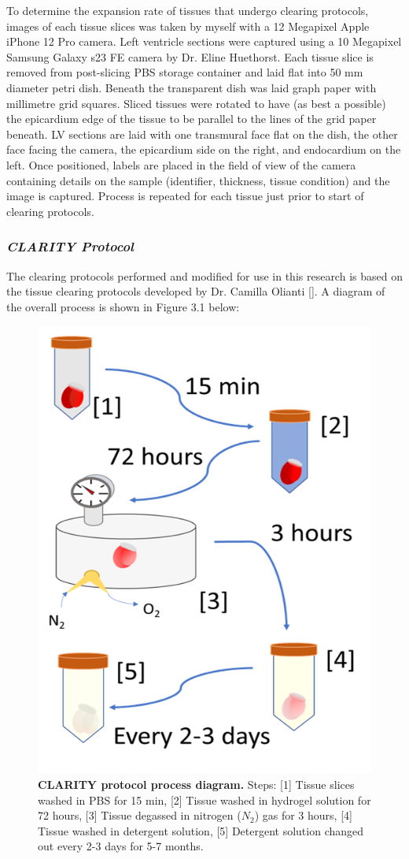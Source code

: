 To determine the expansion rate of tissues that undergo clearing protocols,  images of each tissue slices was taken by myself with a 12 Megapixel Apple iPhone 12 Pro camera. Left ventricle sections were captured using a 10 Megapixel Samsung Galaxy s23 FE camera by Dr. Eline Huethorst. Each tissue slice is removed from post-slicing PBS storage container and laid flat into 50 mm diameter petri dish.  Beneath the transparent dish was laid graph paper with millimetre grid squares. Sliced tissues were rotated to have (as best a possible) the epicardium edge of the tissue to be parallel to the lines of the grid paper beneath. LV sections are laid with one transmural face flat on the dish, the other face facing the camera, the epicardium side on the right, and endocardium on the left. Once positioned, labels are placed in the field of view of the camera containing details on the sample (identifier, thickness, tissue condition) and the image is captured. Process is repeated for each tissue just prior to start of clearing protocols. 

\subsubsection{\textit{CLARITY Protocol}}

The clearing protocols performed and modified for use in this research is based on the tissue clearing protocols developed by Dr. Camilla Olianti []. A diagram of the overall process is shown in Figure 3.1 below:

\begin{figure}[H]
    \centering
    \includegraphics[width=0.5\linewidth]{Figures/Figure3.1.png}
    \caption{\textbf{CLARITY protocol process diagram.} Steps: [1] Tissue slices washed in PBS for 15 min, [2] Tissue washed in hydrogel solution for 72 hours, [3] Tissue degassed in nitrogen ($N_2$) gas for 3 hours, [4] Tissue washed in detergent solution, [5] Detergent solution changed out every 2-3 days for 5-7 months.}
    \label{fig:enter-label}
\end{figure}


